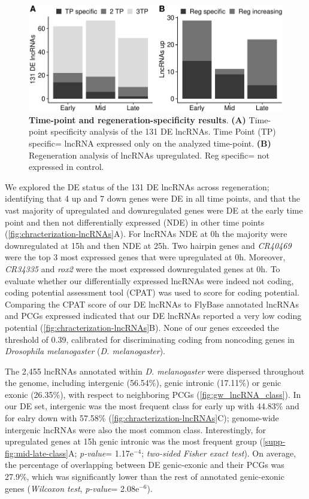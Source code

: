 \begin{figure}[ht!]
  \centering
  \includegraphics[scale=0.6]{plots/results/dme/time.point.reg.specificity.pdf}
  \caption[Time-point and regeneration-specificity results]{\textbf{Time-point and regeneration-specificity results}. \textbf{(A)} Time-point specificity analysis of the 131 DE lncRNAs. Time Point (TP) specific= lncRNA expressed only on the analyzed time-point. \textbf{(B)} Regeneration analysis of lncRNAs upregulated. Reg specific= not expressed in control.}
  \label{fig:time-point-reg-specific}
\end{figure}

We explored the DE status of the 131 DE lncRNAs across regeneration; identifying that 4 up and 7 down genes were DE in all time points, and that the vast majority of upregulated and downregulated genes were DE at the early time point and then not differentially expressed (NDE) in other time points (\autoref{fig:chracterization-lncRNAs}A). For lncRNAs NDE at 0h the majority were downregulated at 15h and then NDE at 25h. Two hairpin genes and \textit{CR40469} were the top 3 most expressed genes that were upregulated at 0h. Moreover, \textit{CR34335} and \textit{rox2} were the most expressed downregulated genes at 0h. To evaluate whether our differentially expressed lncRNAs were indeed not coding, coding potential assessment tool (CPAT) was used to score for coding potential.\autocite{wang_2013_cpat} Comparing the CPAT score of our DE lncRNAs to FlyBase annotated lncRNAs and PCGs expressed indicated that our DE lncRNAs reported a very low coding potential (\autoref{fig:chracterization-lncRNAs}B). None of our genes exceeded the threshold of 0.39, calibrated for discriminating coding from noncoding genes in \textit{Drosophila melanogaster} (\textit{D. melanogaster}).\autocite{wang_2013_cpat}

The 2,455 lncRNAs annotated within \textit{D. melanogaster} were dispersed throughout the genome, including intergenic (56.54\%), genic intronic (17.11\%) or genic exonic (26.35\%), with respect to neighboring PCGs (\autoref{fig:gw_lncRNA_class}).  In our DE set, intergenic was the most frequent class for early up with 44.83\% and for ealry down with 57.58\% (\autoref{fig:chracterization-lncRNAs}C); genome-wide intergenic lncRNAs were also the most common class. Interestingly, for upregulated genes at 15h genic intronic was the most frequent group (\autoref{supp-fig:mid-late-class}A; \textit{p-value}= 1.17e$^{-4}$; \textit{two-sided Fisher exact test}). On average, the percentage of overlapping between DE genic-exonic and their PCGs was 27.9\%, which was significantly lower than the rest of annotated genic-exonic genes (\textit{Wilcoxon test}, \textit{p-value}= 2.08e$^{-6}$).

